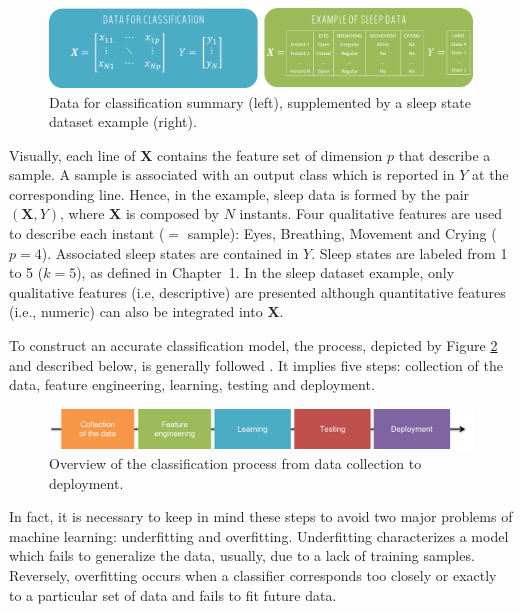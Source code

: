 \documentclass[a4paper,10pt]{article}
\begin{document}
\begin{figure}[htbp]
\centerline{\includegraphics[width=\linewidth]{./figures/data.png}}
\caption{Data for classification summary (left), supplemented by a sleep state dataset example (right).}
\label{dataForm}
\end{figure}

Visually, each line of $\bm{X}$ contains the feature set of dimension $p$ that describe a sample. A sample is associated with an output class which is reported in $Y$ at the corresponding line. Hence, in the example, sleep data is formed by the pair $(\bm{X},Y)$, where $\bm{X}$ is composed by $N$ instants. Four qualitative features are used to describe each instant ($=$ sample): Eyes, Breathing, Movement and Crying ($p=4$). Associated sleep states are contained in $Y$. Sleep states are labeled from 1 to 5 ($k=5$), as defined in Chapter~1.
In the sleep dataset example, only qualitative features (i.e, descriptive) are presented although quantitative features (i.e., numeric) can also be integrated into $\bm{X}$.

To construct an accurate classification model, the process, depicted by Figure \ref{processML} and described below, is generally followed \cite{dangeti2017statistics}. It implies five steps: collection of the data, feature engineering, learning, testing and deployment.

\begin{figure}[htbp]
\centerline{\includegraphics[width=\linewidth]{./figures/process.png}}
\caption{Overview of the classification process from data collection to deployment.}
\label{processML}
\end{figure}

In fact, it is necessary to keep in mind these steps to avoid two major problems of machine learning: underfitting and overfitting.
Underfitting characterizes a model which fails to generalize the data, usually, due to a lack of training samples. Reversely, overfitting occurs when a classifier corresponds too closely or exactly to a particular set of data and fails to fit future data.
\end{document}

